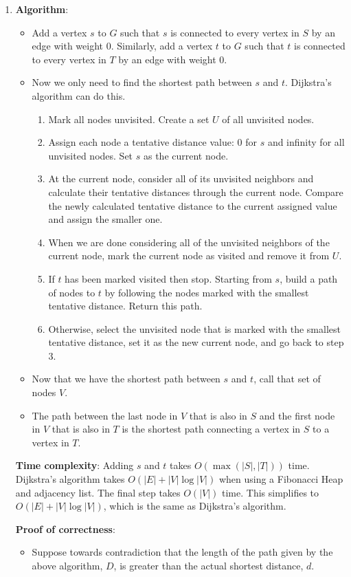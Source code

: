 \documentclass[a4paper, 10pt]{article}
\begin{document}
\begin{enumerate}
	\item \textbf{Algorithm}:
		\begin{itemize}
			\item Add a vertex $s$ to $G$ such that $s$ is connected to every
				vertex in $S$ by an edge with weight 0. Similarly, add a vertex
				$t$ to $G$ such that $t$ is connected to every vertex in $T$ by
				an edge with weight 0.
			\item Now we only need to find the shortest path between $s$ and
				$t$. Dijkstra's algorithm  can do this.
				\begin{enumerate}[label=\arabic*.]
					\item Mark all nodes unvisited. Create a set $U$ of all
						unvisited nodes.
					\item Assign each node a tentative distance value: 0 for $s$
						and infinity for all unvisited nodes. Set $s$ as the
						current node.
					\item At the current node, consider all of its unvisited
						neighbors and calculate their tentative distances
						through the current node. Compare the newly calculated
						tentative distance to the current assigned value and
						assign the smaller one.
					\item When we are done considering all of the unvisited
						neighbors of the current node, mark the current node as
						visited and remove it from $U$.
					\item If $t$ has been marked visited then stop. Starting
						from $s$, build a path of nodes to $t$ by following the
						nodes marked with the smallest tentative distance.
						Return this path.
					\item Otherwise, select the unvisited node that is marked
						with the smallest tentative distance, set it as the new
						current node, and go back to step 3.
				\end{enumerate}
			\item Now that we have the shortest path between $s$ and $t$, call
				that set of nodes $V$.
			\item The path between the last node in $V$ that is also in $S$ and
				the first node in $V$ that is also in $T$ is the shortest path
				connecting a vertex in $S$ to a vertex in $T$.
		\end{itemize}
		
		\textbf{Time complexity}: Adding $s$ and $t$ takes $O(\max (|S|, |T|))$
		time. Dijkstra's algorithm takes $O(|E| + |V| \log |V|)$ when using a
		Fibonacci Heap and adjacency list. The final step takes $O(|V|)$ time.
		This simplifies to $O(|E| + |V| \log |V|)$, which is the same as
		Dijkstra's algorithm.

		\textbf{Proof of correctness}:

		\begin{itemize}
			\item Suppose towards contradiction that the length of the path
				given by the above algorithm, $D$, is greater than the actual
				shortest distance, $d$.
		\end{itemize}
\end{enumerate}
\end{document}
